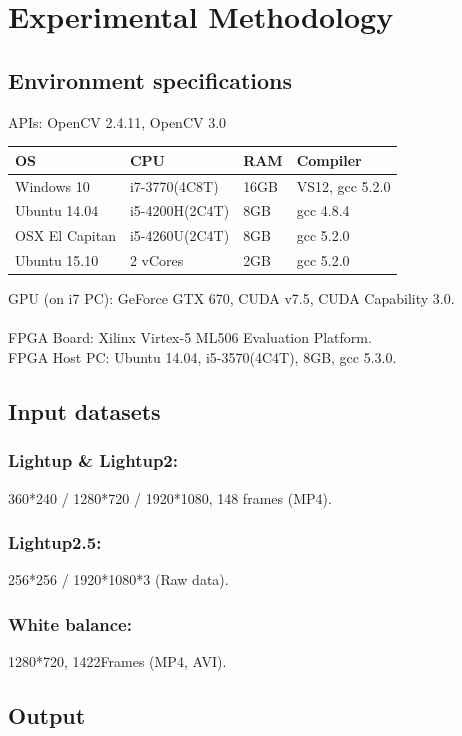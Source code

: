 \documentclass{acm_proc_article-sp}
\begin{document}
\section{Experimental Methodology}
\subsection{Environment specifications}
APIs: OpenCV 2.4.11, OpenCV 3.0 \\
\begin{table}[H]
\centering
\begin{tabular}{|l|l|l|l|} \hline
OS&CPU&RAM&Compiler\\ \hline
Windows 10 & i7-3770(4C8T) & 16GB & VS12, gcc 5.2.0 \\ \hline
Ubuntu 14.04 & i5-4200H(2C4T) & 8GB & gcc 4.8.4 \\ \hline
OSX El Capitan & i5-4260U(2C4T) & 8GB & gcc 5.2.0\\ \hline
Ubuntu 15.10 & 2 vCores & 2GB & gcc 5.2.0 \\ \hline
\end{tabular}
\end{table}
GPU (on i7 PC): GeForce GTX 670, CUDA v7.5, CUDA Capability 3.0. \\
\\
FPGA Board: Xilinx Virtex-5 ML506 Evaluation Platform. \\
FPGA Host PC: Ubuntu 14.04, i5-3570(4C4T), 8GB, gcc 5.3.0.
\subsection{Input datasets}
\subsubsection{Lightup \& Lightup2:}
 360*240 / 1280*720 / 1920*1080, 148 frames (MP4). \\
\subsubsection{Lightup2.5:}
 256*256 / 1920*1080*3 (Raw data). \\
\subsubsection{White balance:}
 1280*720, 1422Frames (MP4, AVI). \\

\subsection{Output}
\end{document}
